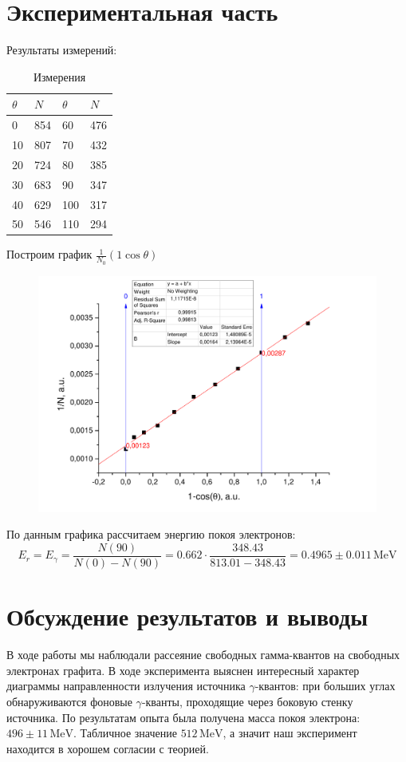 \documentclass[a4paper,12pt]{article}
\begin{document}
	\section{Экспериментальная часть}
		Результаты измерений:
		\begin{table}[h!]
			\centering
			\begin{tabular}{|l|l|l|l|}
				\hline
				$\theta$ & $N$  & $\theta$ & $N$ \\ \hline
				0        & 854 & 60 & 476\\ \hline
				10       & 807 & 70 & 432\\ \hline
				20       & 724 & 80 & 385\\ \hline
				30       & 683 & 90 & 347\\ \hline
				40       & 629 & 100 & 317\\ \hline
				50       & 546 & 110 & 294\\ \hline

				\end{tabular}
				\caption{Измерения}
		\end{table}
	
		\pagebreak
		Построим график $\frac{1}{N_0}(1\cos\theta)$
		\begin{figure}[h!]
			\centering
			\includegraphics[width=\linewidth]{graph1}
		\end{figure}
		
		По данным графика рассчитаем энергию покоя электронов:
		\begin{equation}
			E_{r} = E_{\gamma} = \frac{N(90)}{N(0)-N(90)} = 0.662\cdot\frac{348.43}{813.01-348.43} = 0.4965\pm0.011\, \mathrm{MeV}
		\end{equation}
	\section{Обсуждение результатов и выводы}
		В ходе работы мы наблюдали рассеяние свободных гамма-квантов на свободных электронах графита. В ходе эксперимента выяснен интересный характер диаграммы направленности излучения источника $\gamma$-квантов: при больших углах обнаруживаются фоновые $\gamma$-кванты, проходящие через боковую стенку источника.  По результатам опыта была получена масса покоя электрона: $496\pm11\,\mathrm{MeV}$. Табличное значение $512\,\mathrm{MeV}$, а значит наш эксперимент находится в хорошем согласии с теорией.
					
\end{document}
